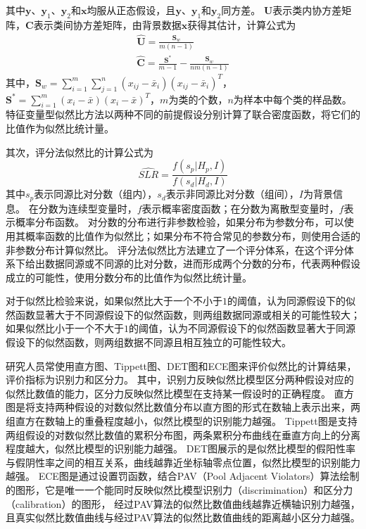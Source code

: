 \documentclass[12pt,a4paper]{article}
\begin{document}
    其中$\bm{y}$、$\bm{y}_1$、$\bm{y}_2$和$\bm{x}$均服从正态假设，且$\bm{y}$、$\bm{y}_1$和$\bm{y}_2$同方差。
    $\bm{U}$表示类内协方差矩阵，$\bm{C}$表示类间协方差矩阵，由背景数据$\bm{x}$获得其估计，计算公式为
    \begin{gather}
        \hat{\bm{U}}=\frac{\bm{S}_w}{m\left(n-1\right)}\\
        \hat{\bm{C}}=\frac{\bm{S}^*}{m-1}-\frac{\bm{S}_w}{nm\left(n-1\right)}\label{c}
    \end{gather}
    其中，$\bm{S}_w=\sum_{i=1}^m\sum_{j=1}^n\left(x_{ij}-\bar{x}_i\right)\left(x_{ij}-\bar{x}_i\right)^T$，$\bm{S}^*=\sum_{i=1}^m\left(x_i-\bar{x}\right)\left(x_i-\bar{x}\right)^T$，$m$为类的个数，$n$为样本中每个类的样品数。
    特征变量型似然比方法以两种不同的前提假设分别计算了联合密度函数，将它们的比值作为似然比统计量。\par
    其次，评分法似然比的计算公式为
    \begin{equation}
        \hat{SLR}=\frac{f\left(s_p|H_p,I\right)}{f\left(s_d|H_d,I\right)}
    \end{equation}
    其中$s_p$表示同源比对分数（组内），$s_d$表示非同源比对分数（组间），$I$为背景信息。
    在分数为连续型变量时，$f$表示概率密度函数；在分数为离散型变量时，$f$表示概率分布函数。
    对分数的分布进行非参数检验，如果分布为参数分布，可以使用其概率函数的比值作为似然比；如果分布不符合常见的参数分布，则使用合适的非参数分布计算似然比。
    评分法似然比方法建立了一个评分体系，在这个评分体系下给出数据同源或不同源的比对分数，进而形成两个分数的分布，代表两种假设成立的可能性，使用分数分布的比值作为似然比统计量。\par
    对于似然比检验来说，如果似然比大于一个不小于$1$的阈值，认为同源假设下的似然函数显著大于不同源假设下的似然函数，则两组数据同源或相关的可能性较大；
    如果似然比小于一个不大于$1$的阈值，认为不同源假设下的似然函数显著大于同源假设下的似然函数，则两组数据不同源且相互独立的可能性较大。\par
    研究人员常使用直方图、Tippett图、DET图和ECE图来评价似然比的计算结果，评价指标为识别力和区分力。
    其中，识别力反映似然比模型区分两种假设对应的似然比数值的能力，区分力反映似然比模型在支持某一假设时的正确程度。
    直方图是将支持两种假设的对数似然比数值分布以直方图的形式在数轴上表示出来，两组直方在数轴上的重叠程度越小，似然比模型的识别能力越强。
    Tippett图是支持两组假设的对数似然比数值的累积分布图，两条累积分布曲线在垂直方向上的分离程度越大，似然比模型的识别能力越强。
    DET图展示的是似然比模型的假阳性率与假阴性率之间的相互关系，曲线越靠近坐标轴零点位置，似然比模型的识别能力越强。
    ECE图是通过设置罚函数，结合PAV（Pool Adjacent Violators）算法绘制的图形，它是唯一一个能同时反映似然比模型识别力（discrimination）和区分力（calibration）的图形，
    经过PAV算法的似然比数值曲线越靠近横轴识别力越强，且真实似然比数值曲线与经过PAV算法的似然比数值曲线的距离越小区分力越强。
\end{document}
